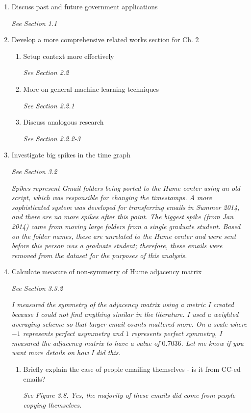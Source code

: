 \documentclass[12pt]{report}
\begin{document}
\begin{enumerate}
    \item Discuss past and future government applications
	\par \textit{See Section 1.1}

    \item Develop a more comprehensive related works section for Ch. 2
    \begin{enumerate}
        \item Setup context more effectively
        \par \textit{See Section 2.2}
        \item More on general machine learning techniques
        \par \textit{See Section 2.2.1}
        \item Discuss analogous research
        \par \textit{See Section 2.2.2-3}
    \end{enumerate}

    \item Investigate big spikes in the time graph
		\par \textit{See Section 3.2}
        \par \textit{Spikes represent Gmail folders being ported to the Hume center using an old script, which was responsible for changing the timestamps.  A more sophisticated system was developed for transferring emails in Summer 2014, and there are no more spikes after this point.  The biggest spike (from Jan 2014) came from moving large folders from a single graduate student.  Based on the folder names, these are unrelated to the Hume center and were sent before this person was a graduate student; therefore, these emails were removed from the dataset for the purposes of this analysis.}


	    \item Calculate measure of non-symmetry of Hume adjacency matrix
     	\par \textit{See Section 3.3.2}
	    \par \textit{I measured the symmetry of the adjacency matrix using a metric I created because I could not find anything similar 
	    	        in the literature.
			    	I used a weighted averaging scheme so that larger email counts mattered more.
	    	        On a scale where $-1$ represents perfect asymmetry and $1$ represents perfect symmetry, I measured the adjacency matrix to have a value of $0.7036$.
	    	        Let me know if you want more details on how I did this.}
    \begin{enumerate}	    
		\item Briefly explain the case of people emailing themselves - is it from CC-ed emails?
		\par \textit{See Figure 3.8.  Yes, the majority of these emails did come from people copying themselves.}
	\end{enumerate}
	


\end{enumerate}
\end{document}

